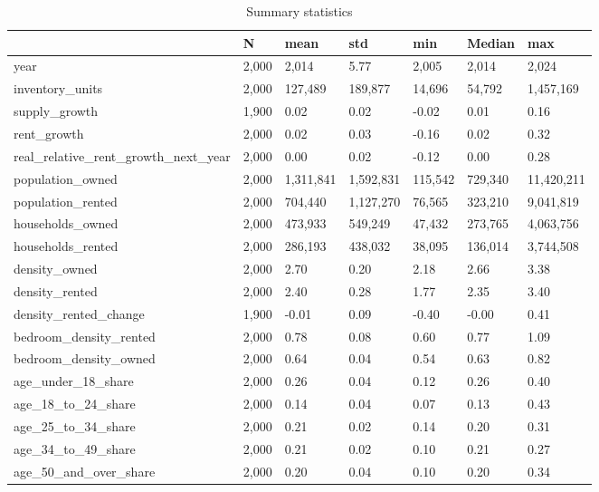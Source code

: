 \begin{table}
\caption{Summary statistics}
\label{tab:summary_stats}
\begin{tabular}{lllllll}
\toprule
 & N & mean & std & min & Median & max \\
\midrule
year & 2,000 & 2,014 & 5.77 & 2,005 & 2,014 & 2,024 \\
inventory\_units & 2,000 & 127,489 & 189,877 & 14,696 & 54,792 & 1,457,169 \\
supply\_growth & 1,900 & 0.02 & 0.02 & -0.02 & 0.01 & 0.16 \\
rent\_growth & 2,000 & 0.02 & 0.03 & -0.16 & 0.02 & 0.32 \\
real\_relative\_rent\_growth\_next\_year & 2,000 & 0.00 & 0.02 & -0.12 & 0.00 & 0.28 \\
population\_owned & 2,000 & 1,311,841 & 1,592,831 & 115,542 & 729,340 & 11,420,211 \\
population\_rented & 2,000 & 704,440 & 1,127,270 & 76,565 & 323,210 & 9,041,819 \\
households\_owned & 2,000 & 473,933 & 549,249 & 47,432 & 273,765 & 4,063,756 \\
households\_rented & 2,000 & 286,193 & 438,032 & 38,095 & 136,014 & 3,744,508 \\
density\_owned & 2,000 & 2.70 & 0.20 & 2.18 & 2.66 & 3.38 \\
density\_rented & 2,000 & 2.40 & 0.28 & 1.77 & 2.35 & 3.40 \\
density\_rented\_change & 1,900 & -0.01 & 0.09 & -0.40 & -0.00 & 0.41 \\
bedroom\_density\_rented & 2,000 & 0.78 & 0.08 & 0.60 & 0.77 & 1.09 \\
bedroom\_density\_owned & 2,000 & 0.64 & 0.04 & 0.54 & 0.63 & 0.82 \\
age\_under\_18\_share & 2,000 & 0.26 & 0.04 & 0.12 & 0.26 & 0.40 \\
age\_18\_to\_24\_share & 2,000 & 0.14 & 0.04 & 0.07 & 0.13 & 0.43 \\
age\_25\_to\_34\_share & 2,000 & 0.21 & 0.02 & 0.14 & 0.20 & 0.31 \\
age\_34\_to\_49\_share & 2,000 & 0.21 & 0.02 & 0.10 & 0.21 & 0.27 \\
age\_50\_and\_over\_share & 2,000 & 0.20 & 0.04 & 0.10 & 0.20 & 0.34 \\
\bottomrule
\end{tabular}
\end{table}

